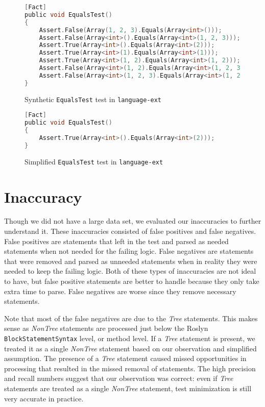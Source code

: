 \begin{figure}
\begin{lstlisting}[language=C, linewidth=0.8\linewidth]
[Fact]
public void EqualsTest()
{
	Assert.False(Array(1, 2, 3).Equals(Array<int>()));
	Assert.False(Array<int>().Equals(Array<int>(1, 2, 3)));
	Assert.True(Array<int>().Equals(Array<int>(2)));
	Assert.True(Array<int>(1).Equals(Array<int>(1)));
	Assert.True(Array<int>(1, 2).Equals(Array<int>(1, 2)));
	Assert.False(Array<int>(1, 2).Equals(Array<int>(1, 2, 3)));
	Assert.False(Array<int>(1, 2, 3).Equals(Array<int>(1, 2)));
}
\end{lstlisting}

\caption{Synthetic \texttt{EqualsTest} test in \texttt{language-ext}}
\label{fig:equalsTestOriginal}
\end{figure}

\begin{figure}
\begin{lstlisting}[language=C, linewidth=0.8\linewidth]
[Fact]
public void EqualsTest()
{
	Assert.True(Array<int>().Equals(Array<int>(2)));
}
\end{lstlisting}

\caption{Simplified \texttt{EqualsTest} test in \texttt{language-ext}}
\label{fig:equalsTestSimplified}
\end{figure}

\section{Inaccuracy}
Though we did not have a large data set, we evaluated our inaccuracies to further understand it. These inaccuracies consisted of false positives and false negatives. False positives are statements that \mytool left in the test and parsed as needed statements when not needed for the failing logic. False negatives are statements that were removed and parsed as unneeded statements when in reality they were needed to keep the failing logic. Both of these types of inaccuracies are not ideal to have, but false positive statements are better to handle because they only take extra time to parse. False negatives are worse since they remove necessary statements.

Note that most of the false negatives are due to the \emph{Tree} statements. This makes sense as \emph{NonTree} statements are processed just below the Roslyn~\cite{wagner_2021} \texttt{BlockStatementSyntax} level, or method level. If a \emph{Tree} statement is present, we treated it as a single \emph{NonTree} statement based on our observation and simplified assumption. The presence of a \emph{Tree} statement caused missed opportunities in processing that resulted in the missed removal of statements. The high precision and recall numbers suggest that our observation was correct: even if \emph{Tree} statements are treated as a single \emph{NonTree} statement, test minimization is still very accurate in practice.

